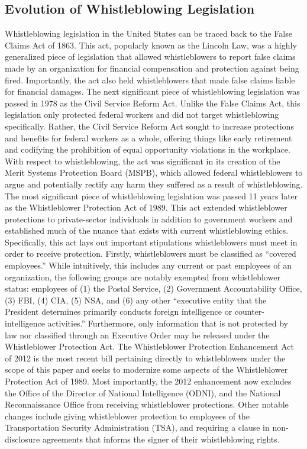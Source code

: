 \documentclass [12 pt] {article}
\begin{document}
\subsection {Evolution of Whistleblowing Legislation}
Whistleblowing legislation in the United States can be traced back to the False Claims Act of 1863. This act, popularly known as the Lincoln Law, was a highly generalized piece of legislation that allowed whistleblowers to report false claims made by an organization for financial compensation and protection against being fired. Importantly, the act also held whistleblowers that made false claims liable for financial damages.
\bigbreak
The next significant piece of whistleblowing legislation was passed in 1978 as the Civil Service Reform Act. Unlike the False Claims Act, this legislation only protected federal workers and did not target whistleblowing specifically. Rather, the Civil Service Reform Act sought to increase protections and benefits for federal workers as a whole, offering things like early retirement and codifying the prohibition of equal opportunity violations in the workplace. With respect to whistleblowing, the act was significant in its creation of the Merit Systems Protection Board (MSPB), which allowed federal whistleblowers to argue and potentially rectify any harm they suffered as a result of whistleblowing.
\bigbreak
The most significant piece of whistleblowing legislation was passed 11 years later as the Whistleblower Protection Act of 1989. This act extended whistleblower protections to private-sector individuals in addition to government workers and established much of the nuance that exists with current whistleblowing ethics. Specifically, this act lays out important stipulations whistleblowers must meet in order to receive protection. Firstly, whistleblowers must be classified as ``covered employees.'' While intuitively, this includes any current or past employees of an organization, the following groups are notably exempted from whistleblower status: employees of (1) the Postal Service, (2) Government Accountability Office, (3) FBI, (4) CIA, (5) NSA, and (6) any other ``executive entity that the President determines primarily conducts foreign intelligence or counter-intelligence activities.'' Furthermore, only information that is not protected by law nor classified through an Executive Order may be released under the Whistleblower Protection Act.
\bigbreak
The Whistleblower Protection Enhancement Act of 2012 is the most recent bill pertaining directly to whistleblowers under the scope of this paper and seeks to modernize some aspects of the Whistleblower Protection Act of 1989. Most importantly, the 2012 enhancement now excludes the Office of the Director of National Intelligence (ODNI), and the National Reconnaissance Office from receiving whistleblower protections. Other notable changes include giving whistleblower protection to employees of the Transportation Security Administration (TSA), and requiring a clause in non-disclosure agreements that informs the signer of their whistleblowing rights.
\end{document}

